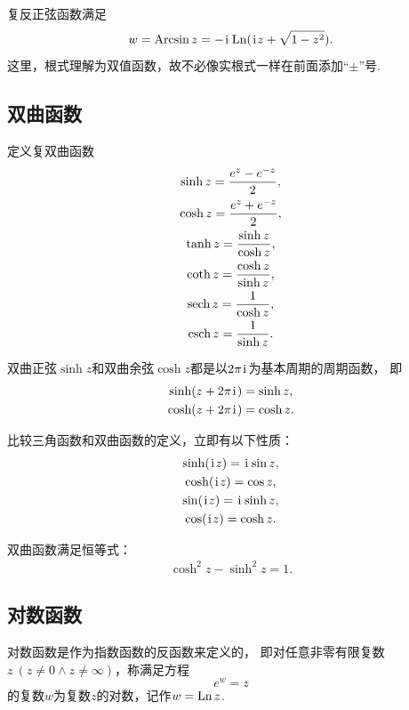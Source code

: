 \begin{property}
复反正弦函数满足\begin{equation*}
w = \operatorname{Arcsin} z = -\kern1pt\mathrm{i}\kern1pt \operatorname{Ln}(\kern1pt\mathrm{i}\kern1pt z + \sqrt{1-z^2}).
\end{equation*}这里，根式理解为双值函数，故不必像实根式一样在前面添加“\(\pm\)”号.
\end{property}

\subsection{双曲函数}
\begin{definition}
定义复双曲函数\begin{gather}
	\sinh z = \frac{e^z-e^{-z}}{2}, \\
	\cosh z = \frac{e^z+e^{-z}}{2}, \\
	\tanh z = \frac{\sinh z}{\cosh z}, \\
	\coth z = \frac{\cosh z}{\sinh z}, \\
	\sech z = \frac{1}{\cosh z}, \\
	\csch z = \frac{1}{\sinh z}.
\end{gather}
\end{definition}

\begin{property}
双曲正弦\(\sinh z\)和双曲余弦\(\cosh z\)都是以\(2\pi\kern1pt\mathrm{i}\kern1pt\)为基本周期的周期函数，
即\begin{gather}
	\sinh(z+2\pi\kern1pt\mathrm{i}\kern1pt) = \sinh z, \\
	\cosh(z+2\pi\kern1pt\mathrm{i}\kern1pt) = \cosh z.
\end{gather}
\end{property}

\begin{property}
比较三角函数和双曲函数的定义，立即有以下性质：\begin{gather}
	\sinh(\kern1pt\mathrm{i}\kern1pt z) = \kern1pt\mathrm{i}\kern1pt\sin z, \\
	\cosh(\kern1pt\mathrm{i}\kern1pt z) = \cos z, \\
	\sin(\kern1pt\mathrm{i}\kern1pt z) = \kern1pt\mathrm{i}\kern1pt\sinh z, \\
	\cos(\kern1pt\mathrm{i}\kern1pt z) = \cosh z.
\end{gather}
\end{property}

\begin{property}
双曲函数满足恒等式：\begin{gather}
	\cosh^2 z - \sinh^2 z = 1.
\end{gather}
\end{property}

\subsection{对数函数}
对数函数是作为指数函数的反函数来定义的，
即对任意非零有限复数\(z\ (z \neq 0 \land z \neq \infty)\)，称满足方程\begin{equation*}
	e^w = z
\end{equation*}的复数\(w\)为复数\(z\)的对数，记作\(w = \operatorname{Ln} z\).

